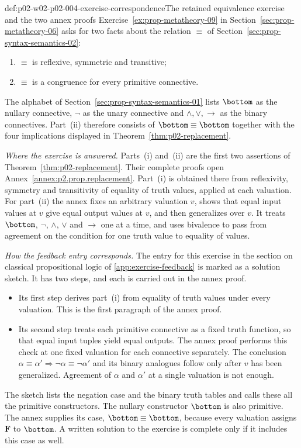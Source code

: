 \begin{hbconvention}{def:p02-w02-p02-004-exercise-correspondence}{The retained equivalence exercise and the two annex proofs}
Exercise~\ref{ex:prop-metatheory-09} in Section~\ref{sec:prop-metatheory-06}
asks for two facts about the relation \(\equiv\) of
Section~\ref{sec:prop-syntax-semantics-02}:
\begin{enumerate}
  \item[(i)] \(\equiv\) is reflexive, symmetric and transitive;
  \item[(ii)] \(\equiv\) is a congruence for every primitive connective.
\end{enumerate}
The alphabet of Section~\ref{sec:prop-syntax-semantics-01} lists \(\bottom\)
as the nullary connective, \(\neg\) as the unary connective and
\(\land,\lor,\to\) as the binary connectives.  Part~(ii) therefore consists of
\(\bottom\equiv\bottom\) together with the four implications displayed in
Theorem~\ref{thm:p02-replacement}.

\emph{Where the exercise is answered.}  Parts~(i) and~(ii) are the first two
assertions of Theorem~\ref{thm:p02-replacement}.  Their complete proofs open
Annex~\ref{annex:p2.prop.replacement}.  Part~(i) is obtained there from
reflexivity, symmetry and transitivity of equality of truth values, applied
at each valuation.  For part~(ii) the annex fixes an arbitrary valuation
\(v\), shows that equal input values at \(v\) give equal output values at
\(v\), and then generalizes over \(v\).  It treats \(\bottom\), \(\neg\),
\(\land\), \(\lor\) and \(\to\) one at a time, and uses bivalence to pass from
agreement on the condition for one truth value to equality of values.

\emph{How the feedback entry corresponds.}  The entry for this exercise in
the section on classical propositional logic of
\cref{app:exercise-feedback} is marked as a solution sketch.  It has two
steps, and each is carried out in the annex proof.
\begin{itemize}
  \item Its first step derives part~(i) from equality of truth values under
        every valuation.  This is the first paragraph of the annex proof.
  \item Its second step treats each primitive connective as a fixed truth
        function, so that equal input tuples yield equal outputs.  The annex
        proof performs this check at one fixed valuation for each connective
        separately.  The conclusion \(\alpha\equiv\alpha'\Rightarrow
        \neg\alpha\equiv\neg\alpha'\) and its binary analogues follow only
        after \(v\) has been generalized.  Agreement of \(\alpha\) and
        \(\alpha'\) at a single valuation is not enough.
\end{itemize}
The sketch lists the negation case and the binary truth tables and calls these
all the primitive constructors.  The nullary constructor \(\bottom\) is also
primitive.  The annex supplies its case, \(\bottom\equiv\bottom\), because
every valuation assigns \(\mathbf F\) to \(\bottom\).  A written solution to
the exercise is complete only if it includes this case as well.


\end{hbconvention}
